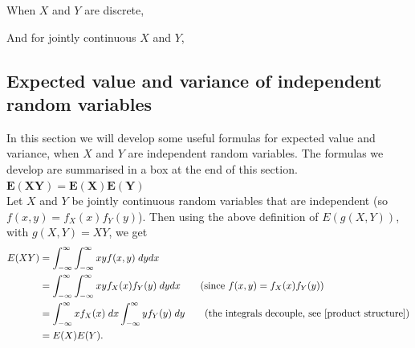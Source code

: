 \noindent When $X$ and $Y$ are discrete,

  	\bigskip
	
	\hfil{}
	\bigskip
	\bigskip

\noindent And for jointly continuous $X$ and $Y$,

  	\bigskip
	
	\hfil{}
	\bigskip
	\bigskip

	
\subsection{Expected value and variance of independent random variables} \label{independent exp and var}
In this section we will develop some useful formulas for expected value and variance, when $X$ and $Y$ are independent random variables. The formulas we develop are summarised in a box at the end of this section. \\

\noindent $\boldsymbol{E(XY) = E(X)E(Y)}$ \\
\noindent Let $X$ and $Y$ be jointly continuous random variables that are independent (so $f(x,y) = f_X(x)f_Y(y)$). Then using the above definition of $E(g(X,Y))$, with $g(X,Y) = XY$, we get
\begin{align*}
E(XY) & = \int_{-\infty}^\infty \int_{-\infty}^\infty xyf(x,y) \; dydx \\
	 & =  \int_{-\infty}^\infty \int_{-\infty}^\infty xyf_X(x)f_Y(y) \; dydx \tag{since $f(x,y) = f_X(x)f_Y(y)$} \\
	 & = \int_{-\infty}^\infty xf_X(x) \; dx \int_{-\infty}^\infty y f_Y(y) \; dy \tag{the integrals decouple, see \ref{product structure}} \\
	 & = E(X)E(Y).
\end{align*}

